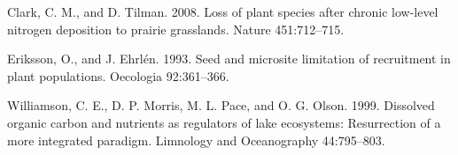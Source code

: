 \documentclass[12pt,]{article}
\begin{document}
\hypertarget{ref-clark_loss_2008}{}
Clark, C. M., and D. Tilman. 2008. Loss of plant species after chronic
low-level nitrogen deposition to prairie grasslands. Nature
451:712--715.

\hypertarget{ref-eriksson_seed_1993}{}
Eriksson, O., and J. Ehrlén. 1993. Seed and microsite limitation of
recruitment in plant populations. Oecologia 92:361--366.

\hypertarget{ref-williamson_dissolved_1999}{}
Williamson, C. E., D. P. Morris, M. L. Pace, and O. G. Olson. 1999.
Dissolved organic carbon and nutrients as regulators of lake ecosystems:
Resurrection of a more integrated paradigm. Limnology and Oceanography
44:795--803.
\end{document}

